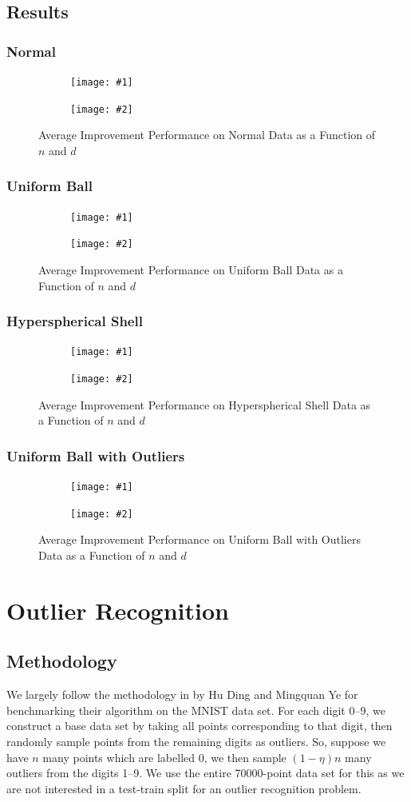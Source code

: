 \documentclass[11pt,twoside]{report}
\newcommand{\pairfigure}[4]{
    \begin{figure}[ht]
        \centering
        \begin{subfigure}[b]{0.475\textwidth}
            \centering
            \texttt{[image: \#1]}
        \end{subfigure}
        \hfill
        \begin{subfigure}[b]{0.475\textwidth}
            \centering
            \texttt{[image: \#2]}
        \end{subfigure}
        \caption{#3}
        \label{#4}
\end{figure}
}
\newcommand{\imprfigure}[3]{
    \pairfigure{improvement_r_benchmarks/avg_pct_func_n_d100_eta0p9_#1.png}{improvement_r_benchmarks/avg_pct_func_d_n1000_eta0p9_#1.png}{#2}{#3}
}
\theoremstyle{definition}
\numberwithin{theorem}{section}
\numberwithin{definition}{section}
\numberwithin{lemma}{section}
\numberwithin{proposition}{section}
\numberwithin{equation}{section}
\numberwithin{figure}{section}
\begin{document}
\subsection{Results}
\subsubsection{Normal}
\imprfigure{normal}{Average Improvement Performance on Normal Data as a Function of $n$ and $d$}{fig:improvement_normal}



\subsubsection{Uniform Ball}
\imprfigure{uniform_ball}{Average Improvement Performance on Uniform Ball Data as a Function of $n$ and $d$}{fig:improvement_unifball}

\subsubsection{Hyperspherical Shell}
\imprfigure{hyperspherical_shell}{Average Improvement Performance on Hyperspherical Shell Data as a Function of $n$ and $d$}{fig:improvement_hypshell}

\subsubsection{Uniform Ball with Outliers}
\imprfigure{uniform_ball_with_outliers}{Average Improvement Performance on Uniform Ball with Outliers Data as a Function of $n$ and $d$}{fig:improvement_unifballwoutliers}

\section{Outlier Recognition}
\subsection{Methodology}
We largely follow the methodology in \cite[Section 4.2]{huding} by Hu Ding and Mingquan Ye for benchmarking their algorithm on the MNIST data set. For each digit 0--9, we construct a base data set by taking all points corresponding to that digit, then randomly sample points from the remaining digits as outliers. So, suppose we have $n$ many points which are labelled 0, we then sample $(1-\eta)n$ many outliers from the digits 1--9. We use the entire 70000-point data set for this as we are not interested in a test-train split for an outlier recognition problem.
\end{document}
